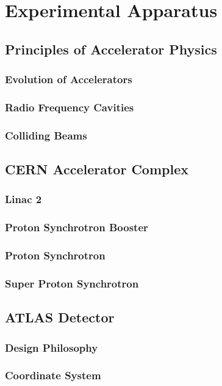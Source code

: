 \chapter{Experimental Apparatus} 

\section{Principles of Accelerator Physics}
\subsection{Evolution of Accelerators}
\subsection{Radio Frequency Cavities}
\subsection{Colliding Beams}

\section{CERN Accelerator Complex}
\subsection{Linac 2}
\subsection{Proton Synchrotron Booster}
\subsection{Proton Synchrotron}
\subsection{Super Proton Synchrotron}



\section{ATLAS Detector}
\subsection{Design Philosophy}
\subsection{Coordinate System}

